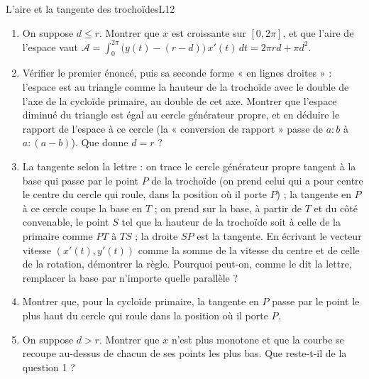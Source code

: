 \documentclass[11pt,a4paper]{article}
\begin{document}
\begin{exercice}{L'aire et la tangente des trochoïdes}{L1}{2}
\begin{enumerate}
\item On suppose $d \le r$. Montrer que $x$ est croissante sur $[0, 2\pi]$, et que
  l'aire de l'espace vaut
  $\mathcal A = \int_0^{2\pi}\bigl(y(t) - (r - d)\bigr)\,x'(t)\,dt = 2\pi r d + \pi d^2$.
\item Vérifier le premier énoncé, puis sa seconde forme « en lignes droites » :
  l'espace est au triangle comme la hauteur de la trochoïde avec le double de
  l'axe de la cycloïde primaire, au double de cet axe. Montrer que l'espace
  diminué du triangle est égal au cercle générateur propre, et en déduire le
  rapport de l'espace à ce cercle (la « conversion de rapport » passe de $a : b$ à
  $a : (a - b)$). Que donne $d = r$ ?
\item La tangente selon la lettre : on trace le cercle générateur propre tangent à
  la base qui passe par le point $P$ de la trochoïde (on prend celui qui a pour
  centre le centre du cercle qui roule, dans la position où il porte $P$) ; la
  tangente en $P$ à ce cercle coupe la base en $T$ ; on prend sur la base, à partir
  de $T$ et du côté convenable, le point $S$ tel que la hauteur de la trochoïde
  soit à celle de la primaire comme $PT$ à $TS$ ; la droite $SP$ est la tangente.
  En écrivant le vecteur vitesse $(x'(t), y'(t))$ comme la somme de la vitesse du
  centre et de celle de la rotation, démontrer la règle. Pourquoi peut-on, comme
  le dit la lettre, remplacer la base par n'importe quelle parallèle ?
\item Montrer que, pour la cycloïde primaire, la tangente en $P$ passe par le point
  le plus haut du cercle qui roule dans la position où il porte $P$.
\item On suppose $d > r$. Montrer que $x$ n'est plus monotone et que la courbe se
  recoupe au-dessus de chacun de ses points les plus bas. Que reste-t-il de la
  question 1 ?
\end{enumerate}
\end{exercice}
\end{document}
